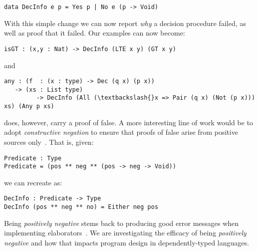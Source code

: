 \begin{Verbatim}
data DecInfo e p = Yes p | No e (p -> Void)
\end{Verbatim}

With this simple change we can now report \emph{why} a decision procedure failed, as well as proof that it failed.
Our examples can now become:

\begin{Verbatim}
isGT : (x,y : Nat) -> DecInfo (LTE x y) (GT x y)
\end{Verbatim}

\noindent
and

\begin{Verbatim}
any : (f  : (x : type) -> Dec (q x) (p x))
   -> (xs : List type)
         -> DecInfo (All (\textbackslash{}x => Pair (q x) (Not (p x))) xs) (Any p xs)
\end{Verbatim}

 does, however, carry a proof of false.
A more interesting line of work would be to adopt \emph{constructive negation} to ensure that proofs of false arise from positive sources only~\cite{msfp/Atkey22}.
That is, given:

\begin{Verbatim}
Predicate : Type
Predicate = (pos ** neg ** (pos -> neg -> Void))
\end{Verbatim}

\noindent
we can recreate  as:

\begin{Verbatim}
DecInfo : Predicate -> Type
DecInfo (pos ** neg ** no) = Either neg pos
\end{Verbatim}

\noindent
Being \emph{positively negative} stems back to producing good error messages when implementing elaborators~\cite{DBLP:journals/jfp/McBrideM04}.
We are investigating the efficacy of being \emph{positively negative} and how that impacts program design in dependently-typed languages.

